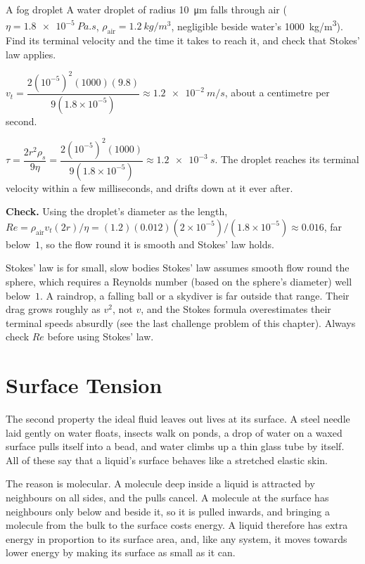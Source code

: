\begin{exbox}{A fog droplet}\label{ex:fluids-fog}
A water droplet of radius \SI{10}{\micro m} falls through air ($\eta=\SI{1.8e-5}{Pa.s}$,
$\rho_{\text{air}}=\SI{1.2}{kg/m^3}$, negligible beside water's \SI{1000}{kg/m^3}). Find its terminal
velocity and the time it takes to reach it, and check that Stokes' law applies.

 $v_t=\dfrac{2(10^{-5})^2(1000)(9.8)}{9(1.8\times10^{-5})}\approx\SI{1.2e-2}{m/s}$, about a
centimetre per second.

 $\tau=\dfrac{2r^2\rho_s}{9\eta}=\dfrac{2(10^{-5})^2(1000)}{9(1.8\times10^{-5})}\approx\SI{1.2e-3}{s}$.
The droplet reaches its terminal velocity within a few milliseconds, and drifts down at it ever after.

 \textbf{Check.} Using the droplet's diameter as the length,
$Re=\rho_{\text{air}}v_t(2r)/\eta=(1.2)(0.012)(2\times10^{-5})/(1.8\times10^{-5})\approx0.016$, far below~$1$,
so the flow round it is smooth and Stokes' law holds. 
\end{exbox}

\begin{trapbox}{Stokes' law is for small, slow bodies}
Stokes' law assumes smooth flow round the sphere, which requires a Reynolds number (based on the sphere's
diameter) well below~$1$. A raindrop, a falling ball or a skydiver is far outside that range. Their drag
grows roughly as $v^2$, not $v$, and the Stokes formula overestimates their terminal speeds absurdly (see
the last challenge problem of this chapter). Always check $Re$ before using Stokes' law.
\end{trapbox}

\section{Surface Tension}\label{sec:surface-tension}

The second property the ideal fluid leaves out lives at its surface. A steel needle laid gently on water
floats, insects walk on ponds, a drop of water on a waxed surface pulls itself into a bead, and water climbs
up a thin glass tube by itself. All of these say that a liquid's surface behaves like a stretched elastic
skin.

The reason is molecular. A molecule deep inside a liquid is attracted by neighbours on all sides, and the
pulls cancel. A molecule at the surface has neighbours only below and beside it, so it is pulled inwards,
and bringing a molecule from the bulk to the surface costs energy. A liquid therefore has extra energy in
proportion to its surface area, and, like any system, it moves towards lower energy by making its surface
as small as it can.

